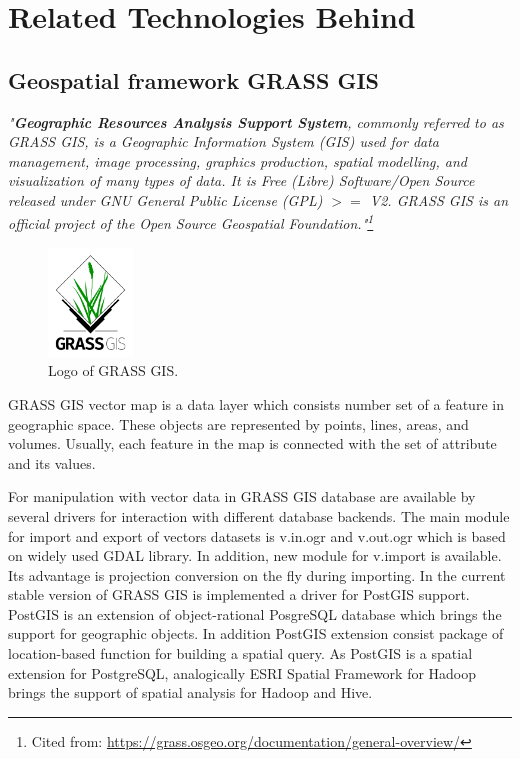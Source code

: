 \documentclass[a4paper,12pt,oneside]{report}
\begin{document}
	
	\section{Related Technologies Behind}
	\subsection{Geospatial framework GRASS GIS}
	
	\textit{"\textbf{Geographic Resources Analysis Support System}, 
		commonly referred to as GRASS GIS, is a Geographic Information System (GIS) used
		for data management, image processing, graphics production, 
		spatial modelling, and visualization of many types of data. It is Free (Libre)
		Software/Open Source released under GNU General Public License 
		(GPL) $>=$ V2. GRASS GIS is an official project of the Open Source Geospatial
		Foundation."\footnote{Cited from:
			\url{https://grass.osgeo.org/documentation/general-overview/}}}
	
	\begin{figure}[!htbp]
		\centering
		\includegraphics[width=0.2\textwidth]{./img/grasslogo.png}
		\caption[Logo GRASS]{\centering Logo of GRASS GIS.}
	\end{figure}   
	GRASS GIS vector map is a data layer which consists number set of a feature in
	geographic space. These objects are represented by points, lines, areas, and volumes. Usually,
	each feature in the map is  connected with the set of attribute and its values.
	
	For manipulation with vector data in GRASS GIS database are available by several drivers for interaction with different database backends. The main module for import and export of vectors datasets is
	v.in.ogr and v.out.ogr which is based on widely used GDAL library. In addition, new module for v.import is available. Its advantage is projection conversion on the fly during importing.
	In the current stable version of GRASS GIS is implemented a driver for PostGIS
	support. PostGIS is an extension of object-rational PosgreSQL database which brings the support for
	geographic objects. In addition PostGIS extension consist package of 
	location-based function for building a spatial query.  
	As PostGIS is a spatial extension for PostgreSQL, analogically ESRI Spatial
	Framework for Hadoop brings the support of spatial analysis for Hadoop and  Hive.
	
\end{document}
